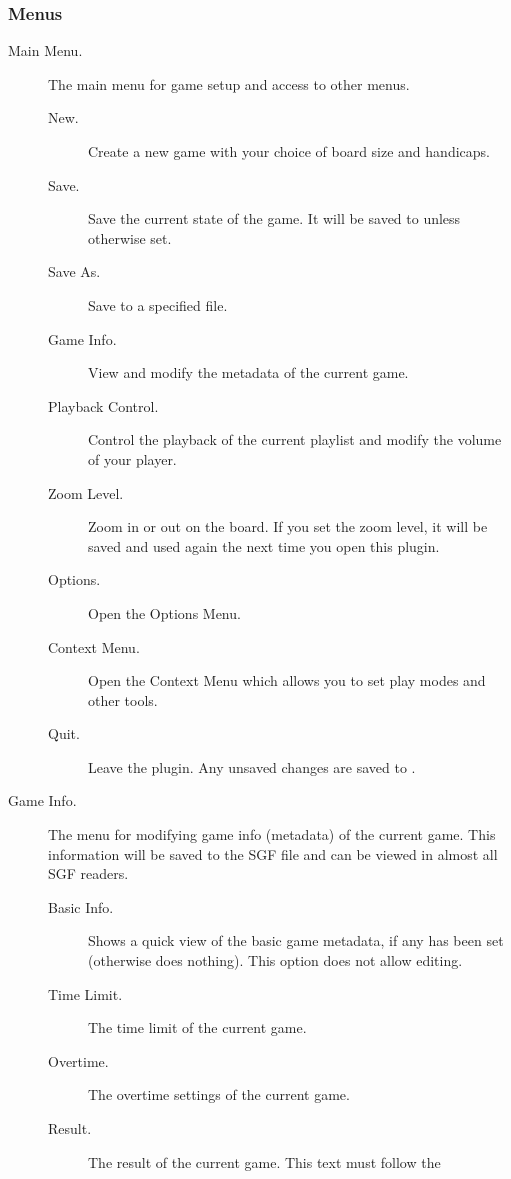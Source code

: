 \subsubsection{Menus}
\begin {description}
\item [Main Menu. ]
    The main menu for game setup and access to other menus.
    \begin{description}
        \item[New.] Create a new game with your choice of board size and handicaps.
        \item[Save.] Save the current state of the game.  It will be saved to
             unless otherwise set.
        \item[Save As.] Save to a specified file.
        \item[Game Info.] View and modify the metadata of the current game.
        \item[Playback Control.] Control the playback of the current playlist
            and modify the volume of your player.
        \item[Zoom Level.] Zoom in or out on the board.  If you set the zoom level,
            it will be saved and used again the next time you open this plugin.
        \item[Options.] Open the Options Menu.
        \item[Context Menu.] Open the Context Menu which allows you to set play
            modes and other tools.
        \item[Quit.] Leave the plugin.  Any unsaved changes are saved to
            .
    \end{description}
\item [Game Info. ]
    The menu for modifying game info (metadata) of the current game.  This
    information will be saved to the SGF file and can be viewed in almost all
    SGF readers.
    \begin{description}
        \item[Basic Info.] Shows a quick view of the basic game metadata, if any
            has been set (otherwise does nothing).  This option does not allow
            editing.
        \item[Time Limit.] The time limit of the current game.
        \item[Overtime.] The overtime settings of the current game.
        \item[Result.] The result of the current game. This text must follow the

\end{description}
\end{description}
